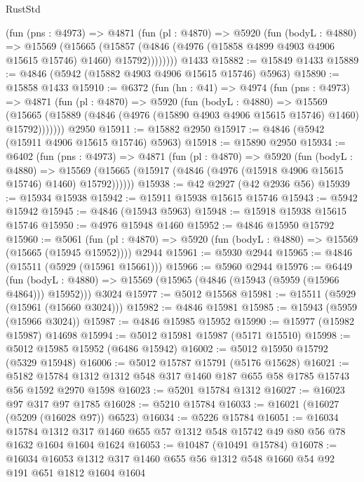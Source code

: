 \begin{lexlean}{RustStd}
\begin{coremodule}
        (fun (pns : @4973) =>
        @4871
          (fun (pl : @4870) =>
          @5920
            (fun (bodyL : @4880) =>
            @15569
              (@15665
                (@15857 (@4846 (@4976 (@15858 @4899 @4903 @4906 @15615 @15746) @1460) @15792))))))))
    @1433
@15882 := @15849 @1433
@15889 := @4846 (@5942 (@15882 @4903 @4906 @15615 @15746) @5963)
@15890 := @15858 @1433
@15910 := @6372
    (fun (hn : @41) =>
    @4974
      (fun (pns : @4973) =>
      @4871
        (fun (pl : @4870) =>
        @5920
          (fun (bodyL : @4880) =>
          @15569
            (@15665 (@15889 (@4846 (@4976 (@15890 @4903 @4906 @15615 @15746) @1460) @15792)))))))
    @2950
@15911 := @15882 @2950
@15917 := @4846 (@5942 (@15911 @4906 @15615 @15746) @5963)
@15918 := @15890 @2950
@15934 := @6402
    (fun (pns : @4973) =>
    @4871
      (fun (pl : @4870) =>
      @5920
        (fun (bodyL : @4880) =>
        @15569 (@15665 (@15917 (@4846 (@4976 (@15918 @4906 @15615 @15746) @1460) @15792))))))
@15938 := @42 @2927 (@42 @2936 @56)
@15939 := @15934 @15938
@15942 := @15911 @15938 @15615 @15746
@15943 := @5942 @15942
@15945 := @4846 (@15943 @5963)
@15948 := @15918 @15938 @15615 @15746
@15950 := @4976 @15948 @1460
@15952 := @4846 @15950 @15792
@15960 := @5061
    (fun (pl : @4870) => @5920 (fun (bodyL : @4880) => @15569 (@15665 (@15945 @15952))))
    @2944
@15961 := @5930 @2944
@15965 := @4846 (@15511 (@5929 (@15961 @15661)))
@15966 := @5960 @2944
@15976 := @6449
    (fun (bodyL : @4880) => @15569 (@15965 (@4846 (@15943 (@5959 (@15966 @4864))) @15952)))
    @3024
@15977 := @5012 @15568
@15981 := @15511 (@5929 (@15961 (@15660 @3024)))
@15982 := @4846 @15981
@15985 := @15943 (@5959 (@15966 @3024))
@15987 := @4846 @15985 @15952
@15990 := @15977 (@15982 @15987) @14698
@15994 := @5012 @15981 @15987 (@5171 @15510)
@15998 := @5012 @15985 @15952 (@6486 @15942)
@16002 := @5012 @15950 @15792 (@5329 @15948)
@16006 := @5012 @15787 @15791 (@5176 @15628)
@16021 := @5182 @15784 @1312 @1312 @548 @317 @1460 @187 @655 @58 @1785 @15743 @56 @1592 @2970 @1598
@16023 := @5201 @15784 @1312
@16027 := @16023 @97 @317 @97 @1785
@16028 := @5210 @15784
@16033 := @16021 (@16027 (@5209 (@16028 @97)) @6523)
@16034 := @5226 @15784
@16051 := @16034
    @15784
    @1312
    @317
    @1460
    @655
    @57
    @1312
    @548
    @15742
    @49
    @80
    @56
    @78
    @1632
    @1604
    @1604
    @1624
@16053 := @10487 (@10491 @15784)
@16078 := @16034
    @16053
    @1312
    @317
    @1460
    @655
    @56
    @1312
    @548
    @1660
    @54
    @92
    @191
    @651
    @1812
    @1604
    @1604

\end{coremodule}
\end{lexlean}
